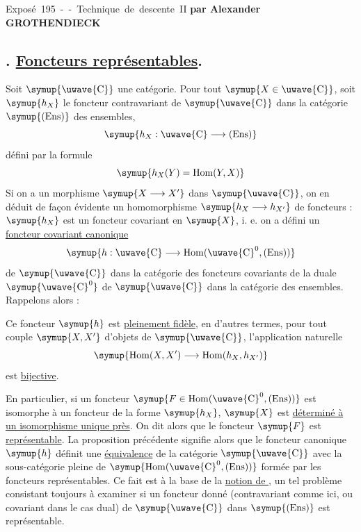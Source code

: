 \unit{Exposé 195 -- Technique de descente II}
%
  {\sffamily\bfseries par Alexander GROTHENDIECK}


\subsection*{. \uline{Foncteurs représentables}.}

Soit $\symup{\text{\uwave{C}}}$ une catégorie. Pour tout $\symup{X\in\text{\uwave{C}}}$, soit $\symup{h_X}$ le
foncteur contravariant de $\symup{\text{\uwave{C}}}$ dans la catégorie $\symup{(\operatorname{Ens})}$
des ensembles,
\[
  \symup{h_X:\text{\uwave{C}}\longrightarrow(\operatorname{Ens})}
\]
défini par la formule
\[
  \symup{h_X(Y)=\operatorname{Hom}(Y,X)}
\]
Si on a un morphisme $\symup{X\longrightarrow X'}$ dans $\symup{\text{\uwave{C}}}$, on en déduit de
façon évidente un homomorphisme $\symup{h_X\longrightarrow h_{X'}}$ de foncteurs :
$\symup{h_X}$ est un foncteur covariant en $\symup{X}$, i. e. on a défini un \uline{foncteur covariant canonique}
\[
  \symup{h:\text{\uwave{C}}\longrightarrow
  \operatorname{Hom}(\text{\uwave{C}}^0,(\operatorname{Ens}))}
\]
de $\symup{\text{\uwave{C}}}$ dans la catégorie des foncteurs covariants de la duale
$\symup{\text{\uwave{C}}^0}$ de $\symup{\text{\uwave{C}}}$ dans la catégorie des ensembles. Rappelons
alors :

 Ce foncteur $\symup{h}$ est \uline{pleinement fidèle}, en
d'autres termes, pour tout couple $\symup{X,X'}$ d'objets de $\symup{\text{\uwave{C}}}$,
l'application naturelle
\[
  \symup{\operatorname{Hom}(X,X')\longrightarrow
  \operatorname{Hom}(h_X,h_{X'})}
\]
est \uline{bijective}.

En particulier, si un foncteur
$\symup{F\in\operatorname{Hom}(\text{\uwave{C}}^0,(\operatorname{Ens}))}$ est isomorphe à
un foncteur de la forme $\symup{h_X}$, $\symup{X}$ est \uline{déterminé à un isomorphisme unique près}.
On dit alors que le foncteur $\symup{F}$ est \uline{représentable}. La proposition
précédente signifie alors que le foncteur canonique $\symup{h}$ définit une \uline{équivalence}
de la catégorie $\symup{\text{\uwave{C}}}$ avec la sous-catégorie pleine de
$\symup{\operatorname{Hom}(\text{\uwave{C}}^0,(\operatorname{Ens}))}$ formée par les
foncteurs représentables. Ce fait est à la base de la \uline{notion de }, un tel problème consistant toujours à examiner si
un foncteur donné (contravariant comme ici, ou covariant dans le cas dual) de
$\symup{\text{\uwave{C}}}$ dans $\symup{(\operatorname{Ens})}$ est représentable.

